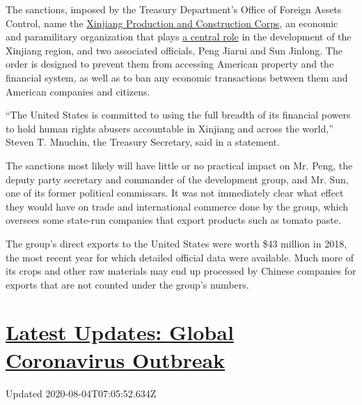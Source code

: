 The sanctions, imposed by the Treasury Department's Office of Foreign
Assets Control, name the
\href{https://www.nytimes3xbfgragh.onion/2009/08/07/world/asia/07xinjiang.html}{Xinjiang
Production and Construction Corps}, an economic and paramilitary
organization that plays
\href{https://www.andrewerickson.com/2019/11/the-xinjiang-production-construction-corps-key-policy-tool-from-mao-to-xi/}{a
central role} in the development of the Xinjiang region, and two
associated officials, Peng Jiarui and Sun Jinlong. The order is designed
to prevent them from accessing American property and the financial
system, as well as to ban any economic transactions between them and
American companies and citizens.

``The United States is committed to using the full breadth of its
financial powers to hold human rights abusers accountable in Xinjiang
and across the world,'' Steven T. Mnuchin, the Treasury Secretary, said
in a statement.

The sanctions most likely will have little or no practical impact on Mr.
Peng, the deputy party secretary and commander of the development group,
and Mr. Sun, one of its former political commissars. It was not
immediately clear what effect they would have on trade and international
commerce done by the group, which oversees some state-run companies that
export products such as tomato paste.

The group's direct exports to the United States were worth \$43 million
in 2018, the most recent year for which detailed official data were
available. Much more of its crops and other raw materials may end up
processed by Chinese companies for exports that are not counted under
the group's numbers.

\hypertarget{latest-updates-global-coronavirus-outbreak}{%
\section{\texorpdfstring{\href{https://www.nytimes3xbfgragh.onion/2020/08/03/world/coronavirus-covid-19.html?action=click\&pgtype=Article\&state=default\&region=MAIN_CONTENT_1\&context=storylines_live_updates}{Latest
Updates: Global Coronavirus
Outbreak}}{Latest Updates: Global Coronavirus Outbreak}}\label{latest-updates-global-coronavirus-outbreak}}

Updated 2020-08-04T07:05:52.634Z

